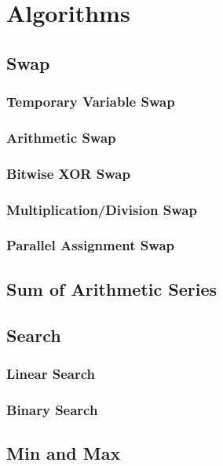 \chapter{Algorithms}%
\section{Swap}
\subsection{Temporary Variable Swap}

\subsection{Arithmetic Swap}

\subsection{Bitwise XOR Swap}

\subsection{Multiplication/Division Swap}

\subsection{Parallel Assignment Swap}

\section{Sum of Arithmetic Series}

\section{Search}

\subsection{Linear Search}\label{lbl-linearsch}

\subsection{Binary Search}

\section{Min and Max}


